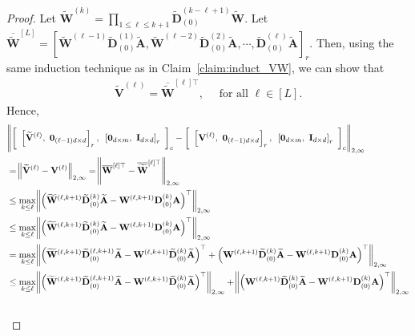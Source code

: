 \begin{proof}
	Let $\widetilde{\mathbf{W}}^{(k)} = \prod_{1 \le \ell \le k + 1} \widetilde{\mathbf{D}}_{(0)}^{(k - \ell + 1)} \widetilde{\mathbf{W}}$. Let $\overline{\widetilde{\mathbf{W}}}^{[L]} = [\widetilde{\mathbf{W}}^{(\ell - 1)} \widetilde{\mathbf{D}}_{(0)}^{(1)} \widetilde{\mathbf{A}}, \widetilde{\mathbf{W}}^{(\ell-2)} \widetilde{\mathbf{D}}_{(0)}^{(2)} \widetilde{\mathbf{A}}, \cdots, \widetilde{\mathbf{D}}_{(0)}^{(\ell)} \widetilde{\mathbf{A}}]_r$. Then, using the same induction technique as in Claim~\ref{claim:induct_VW}, we can show that
	\begin{align*}
		\widetilde{\mathbf{V}}^{(\ell)} = \overline{\widetilde{\mathbf{W}}}^{[\ell]\top}, \quad \text{ for all } \ell \in [L].
	\end{align*}
	Hence,
	\begingroup
	\begin{align*} \allowdisplaybreaks
		&\norm{\left[\text{ }\left[\widetilde{\mathbf{V}}^{(\ell)}, \text{ } \mathbf{0}_{(\ell - 1)d \times d}\right]_r,\text{ } \left[\mathbf{0}_{d \times m},\text{ } \mathbf{I}_{d \times d}\right]_r\text{ }\right]_c  - \left[\text{ }\left[\mathbf{V}^{(\ell)}, \text{ } \mathbf{0}_{(\ell - 1)d \times d}\right]_r,\text{ } \left[\mathbf{0}_{d \times m},\text{ } \mathbf{I}_{d \times d}\right]_r\text{ }\right]_c }_{2, \infty} \\&= \norm{\widetilde{\mathbf{V}}^{(\ell)} - \mathbf{V}^{(\ell)}}_{2, \infty} = \norm{\overline{\mathbf{W}}^{[\ell]\top} - \overline{\widetilde{\mathbf{W}}}^{[\ell]\top}}_{2, \infty}
		\\&\le \max_{k \le \ell} \norm{\left(\widetilde{\mathbf{W}}^{(\ell, k+1)} \widetilde{\mathbf{D}}_{(0)}^{(k)} \widetilde{\mathbf{A}} - \mathbf{W}^{(\ell, k+1)} \mathbf{D}_{(0)}^{(k)} \mathbf{A}\right)^{\top}}_{2, \infty} \\&
		\le \max_{k \le \ell} \norm{\left(\widetilde{\mathbf{W}}^{(\ell, k+1)} \widetilde{\mathbf{D}}_{(0)}^{(k)} \widetilde{\mathbf{A}} - \mathbf{W}^{(\ell, k+1)} \mathbf{D}_{(0)}^{(k)} \mathbf{A} \right)^{\top}}_{2, \infty} \\&
		=  \max_{k \le \ell} \norm{\left(\widetilde{\mathbf{W}}^{(\ell, k+1)} \widetilde{\mathbf{D}}_{(0)}^{(\ell, k+1)} \widetilde{\mathbf{A}} - \mathbf{W}^{(\ell, k+1)} \widetilde{\mathbf{D}}_{(0)}^{(k)} \widetilde{\mathbf{A}}\right)^{\top} + \left(\mathbf{W}^{(\ell, k+1)} \widetilde{\mathbf{D}}_{(0)}^{(k)} \widetilde{\mathbf{A}} - \mathbf{W}^{(\ell, k+1)} \mathbf{D}_{(0)}^{(k)} \mathbf{A} \right)^{\top}}_{2, \infty} \\&
		\le  \max_{k \le \ell} \norm{\left(\widetilde{\mathbf{W}}^{(\ell, k+1)} \widetilde{\mathbf{D}}_{(0)}^{(\ell, k+1)} \widetilde{\mathbf{A}} - \mathbf{W}^{(\ell, k+1)} \widetilde{\mathbf{D}}_{(0)}^{(k)} \widetilde{\mathbf{A}}\right)^{\top}}_{2, \infty} + \norm{\left(\mathbf{W}^{(\ell, k+1)} \widetilde{\mathbf{D}}_{(0)}^{(k)} \widetilde{\mathbf{A}} - \mathbf{W}^{(\ell, k+1)} \mathbf{D}_{(0)}^{(k)} \mathbf{A} \right)^{\top}}_{2, \infty} \\&

\end{align*}
\end{proof}
